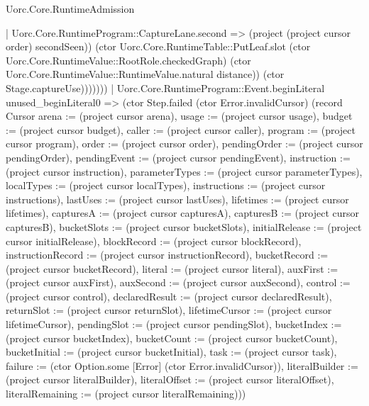 \begin{lexlean}{Uorc.Core.RuntimeAdmission}
\begin{semanticmodule}
{                      | Uorc.Core.RuntimeProgram::CaptureLane.second => (project (project cursor order) secondSeen)) (ctor Uorc.Core.RuntimeTable::PutLeaf.slot (ctor Uorc.Core.RuntimeValue::RootRole.checkedGraph) (ctor Uorc.Core.RuntimeValue::RuntimeValue.natural distance)) (ctor Stage.captureUse)))))))
          | Uorc.Core.RuntimeProgram::Event.beginLiteral unused_beginLiteral0 => (ctor Step.failed (ctor Error.invalidCursor) (record Cursor {arena := (project cursor arena), usage := (project cursor usage), budget := (project cursor budget), caller := (project cursor caller), program := (project cursor program), order := (project cursor order), pendingOrder := (project cursor pendingOrder), pendingEvent := (project cursor pendingEvent), instruction := (project cursor instruction), parameterTypes := (project cursor parameterTypes), localTypes := (project cursor localTypes), instructions := (project cursor instructions), lastUses := (project cursor lastUses), lifetimes := (project cursor lifetimes), capturesA := (project cursor capturesA), capturesB := (project cursor capturesB), bucketSlots := (project cursor bucketSlots), initialRelease := (project cursor initialRelease), blockRecord := (project cursor blockRecord), instructionRecord := (project cursor instructionRecord), bucketRecord := (project cursor bucketRecord), literal := (project cursor literal), auxFirst := (project cursor auxFirst), auxSecond := (project cursor auxSecond), control := (project cursor control), declaredResult := (project cursor declaredResult), returnSlot := (project cursor returnSlot), lifetimeCursor := (project cursor lifetimeCursor), pendingSlot := (project cursor pendingSlot), bucketIndex := (project cursor bucketIndex), bucketCount := (project cursor bucketCount), bucketInitial := (project cursor bucketInitial), task := (project cursor task), failure := (ctor Option.some [Error] (ctor Error.invalidCursor)), literalBuilder := (project cursor literalBuilder), literalOffset := (project cursor literalOffset), literalRemaining := (project cursor literalRemaining)}))
}
\end{semanticmodule}
\end{lexlean}
